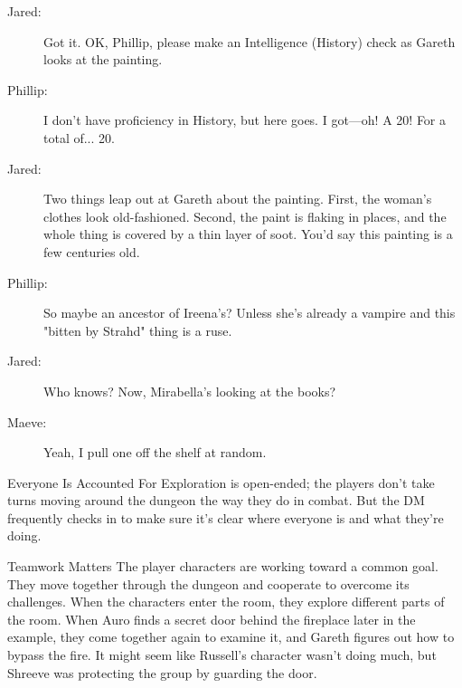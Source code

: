 \documentclass[10pt,a4paper,twoside,bg=print,twocolumn,openany,nodeprecatedcode]{dndbook}
\begin{document}
{\par \vspace { 9pt plus 3pt minus 3pt } \noindent  {} \nopagebreak }

\begin{description}
\item[Jared:]
Got it. OK, Phillip, please make an Intelligence (History) check as Gareth looks at the painting.
\item[Phillip:]
I don't have proficiency in History, but here goes. I got—oh! A 20! For a total of... 20.
\end{description}


\begin{description}
\item[Jared:]
Two things leap out at Gareth about the painting. First, the woman's clothes look old-fashioned. Second, the paint is flaking in places, and the whole thing is covered by a thin layer of soot. You'd say this painting is a few centuries old.
\item[Phillip:]
So maybe an ancestor of Ireena's? Unless she's already a vampire and this "bitten by Strahd" thing is a ruse.
\item[Jared:]
Who knows? Now, Mirabella's looking at the books?
\item[Maeve:]
Yeah, I pull one off the shelf at random.
\end{description}

\begin{DndSidebar}[float=!b]{Everyone Is Accounted For}
Exploration is open-ended; the players don't take turns moving around the dungeon the way they do in combat. But the DM frequently checks in to make sure it's clear where everyone is and what they're doing.



\end{DndSidebar}

\begin{DndSidebar}[float=!b]{Teamwork Matters}
The player characters are working toward a common goal. They move together through the dungeon and cooperate to overcome its challenges. When the characters enter the room, they explore different parts of the room. When Auro finds a secret door behind the fireplace later in the example, they come together again to examine it, and Gareth figures out how to bypass the fire. It might seem like Russell's character wasn't doing much, but Shreeve was protecting the group by guarding the door.



\end{DndSidebar}
\end{document}

